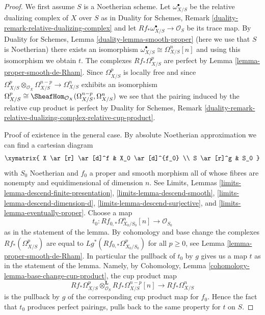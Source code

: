 \begin{proof}
We first assume $S$ is a Noetherian scheme.
Let $\omega^\bullet_{X/S}$ be the relative dualizing complex of $X$ over $S$ as
in Duality for Schemes, Remark \ref{duality-remark-relative-dualizing-complex}
and let $Rf_*\omega_{X/S}^\bullet \to \mathcal{O}_S$ be its trace map. By
Duality for Schemes, Lemma \ref{duality-lemma-smooth-proper}
(here we use that $S$ is Noetherian)
there exists an isomorphism $\omega^\bullet_{X/S} \cong \Omega^n_{X/S}[n]$
and using this isomorphism we obtain $t$. The complexes $Rf_*\Omega^p_{X/S}$
are perfect by Lemma \ref{lemma-proper-smooth-de-Rham}.
Since $\Omega^p_{X/S}$ is locally free and since
$\Omega^p_{X/S} \otimes_{\mathcal{O}_X} \Omega^{n - p}_{X/S} \to
\Omega^n_{X/S}$ exhibits an isomorphism $\Omega^p_{X/S} \cong
\SheafHom_{\mathcal{O}_X}(\Omega^{n - p}_{X/S}, \Omega^n_{X/S})$
we see that the pairing induced by the relative cup product is perfect by
Duality for Schemes, Remark
\ref{duality-remark-relative-dualizing-complex-relative-cup-product}.

\medskip\noindent
Proof of existence in the general case.
By absolute Noetherian approximation we can find a cartesian diagram
$$
\xymatrix{
X \ar[r] \ar[d]^f & X_0 \ar[d]^{f_0} \\
S \ar[r]^g & S_0
}
$$
with $S_0$ Noetherian and $f_0$ a proper and smooth morphism
all of whose fibres are nonempty and equidimensional of dimension $n$.
See Limits, Lemmas \ref{limits-lemma-descend-finite-presentation},
\ref{limits-lemma-descend-smooth}, \ref{limits-lemma-descend-dimension-d},
\ref{limits-lemma-descend-surjective}, and
\ref{limits-lemma-eventually-proper}. Choose a map
$$
t_0 : Rf_{0, *}\Omega^n_{X_0/S_0}[n] \longrightarrow \mathcal{O}_{S_0}
$$
as in the statement of the lemma. By cohomology and base change the
complexes $Rf_*(\Omega^p_{X/S})$ are equal to
$Lg^*(Rf_{0, *}\Omega^p_{X_0/S_0})$ for all $p \geq 0$, see
Lemma \ref{lemma-proper-smooth-de-Rham}. In particular the pullback
of $t_0$ by $g$ gives us a map $t$ as in the statement of the lemma.
Namely, by Cohomology, Lemma \ref{cohomology-lemma-base-change-cup-product},
the cup product map
$$
Rf_*\Omega^p_{X/S}
\otimes_{\mathcal{O}_S}^\mathbf{L}
Rf_*\Omega^{n - p}_{X/S}[n]
\longrightarrow
Rf_*\Omega^n_{X/S}
$$
is the pullback by $g$ of the corresponding cup product map for $f_0$.
Hence the fact that $t_0$ produces perfect pairings, pulls back to
the same property for $t$ on $S$.


\end{proof}
